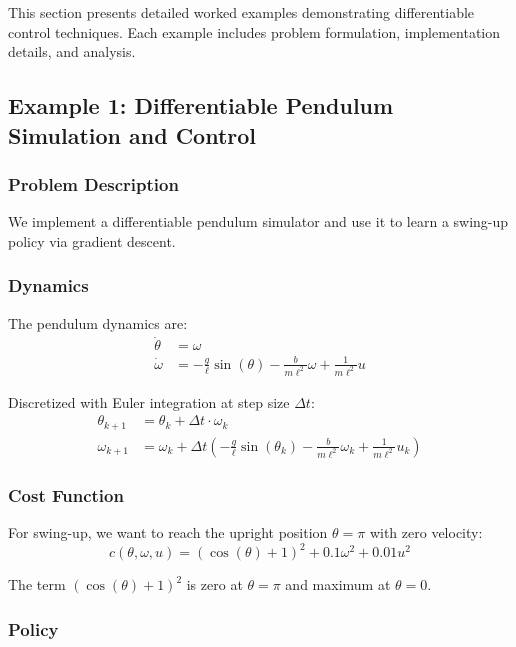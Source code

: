 This section presents detailed worked examples demonstrating differentiable control techniques. Each example includes problem formulation, implementation details, and analysis.

\subsection{Example 1: Differentiable Pendulum Simulation and Control}

\subsubsection{Problem Description}

We implement a differentiable pendulum simulator and use it to learn a swing-up policy via gradient descent.

\subsubsection{Dynamics}

The pendulum dynamics are:
\begin{align}
\dot{\theta} &= \omega \\
\dot{\omega} &= -\frac{g}{\ell} \sin(\theta) - \frac{b}{m\ell^2} \omega + \frac{1}{m\ell^2} u
\end{align}

Discretized with Euler integration at step size $\Delta t$:
\begin{align}
\theta_{k+1} &= \theta_k + \Delta t \cdot \omega_k \\
\omega_{k+1} &= \omega_k + \Delta t \left( -\frac{g}{\ell} \sin(\theta_k) - \frac{b}{m\ell^2} \omega_k + \frac{1}{m\ell^2} u_k \right)
\end{align}

\subsubsection{Cost Function}

For swing-up, we want to reach the upright position $\theta = \pi$ with zero velocity:
\begin{equation}
c(\theta, \omega, u) = (\cos(\theta) + 1)^2 + 0.1 \omega^2 + 0.01 u^2
\end{equation}

The term $(\cos(\theta) + 1)^2$ is zero at $\theta = \pi$ and maximum at $\theta = 0$.

\subsubsection{Policy}

